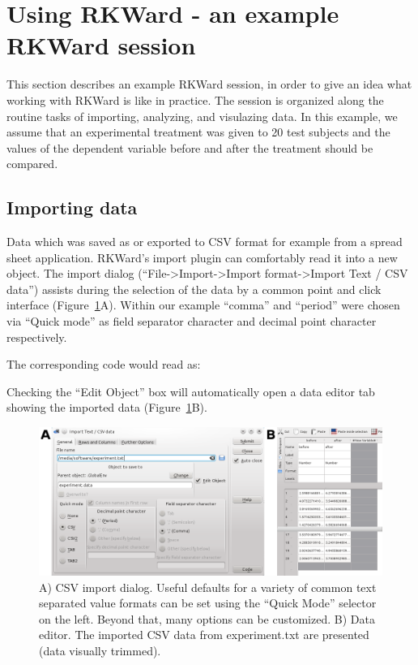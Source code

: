 \section{Using RKWard - an example RKWard session}
\label{sec:using_RKWard}
This section describes an example RKWard session, in order to give an idea
what working with RKWard is like in practice.
The session is organized along the routine tasks of importing,
analyzing, and visulazing data. In this example, we assume that an experimental
treatment was given to 20 test subjects and the values of the dependent
variable before and after the treatment should be compared. 

\subsection{Importing data}
\label{sec:importing_data}
Data which was saved as or exported to CSV format for example from a
spread sheet application. RKWard's import plugin can
comfortably read it into a new  object.
The import dialog (``File->Import->Import
format->Import Text / CSV data'') assists during the
selection of the data by a common point and click interface (Figure~\ref{fig:import_data}A). Within our
example ``comma'' and ``period'' were chosen via ``Quick mode'' as field
separator character and decimal point character respectively.

The corresponding  code would read as:



Checking the ``Edit Object'' box will automatically open a data editor tab
showing the imported data (Figure~\ref{fig:import_data}B).

\begin{figure}[htp]
 \centering
 \includegraphics[width=15.5cm]{../figures/import_data.png}
 \caption{A) CSV import dialog. Useful defaults for a variety of common text separated value formats can
  be set using the ``Quick Mode'' selector on the left. Beyond that, many options can be customized. B) Data editor. The imported CSV
  data from experiment.txt are presented (data visually trimmed).}
 \label{fig:import_data}
\end{figure}

